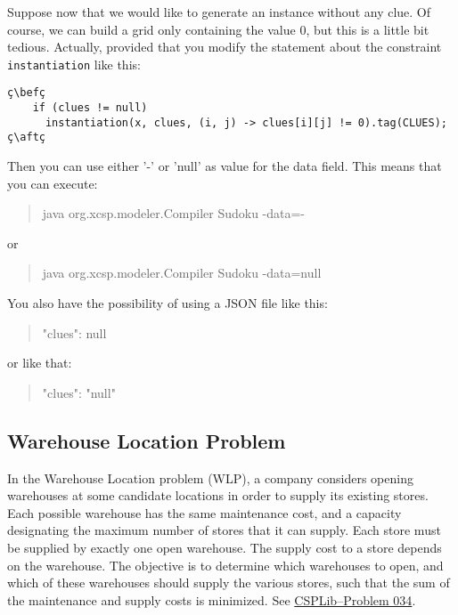 \documentclass[10pt]{article}
\newcommand{\gb}[1]{{\tt #1}} %
\newenvironment{myvb}{\endgraf\small\verbatim}{\endverbatim}
\def\bef{\rule{10cm}{0.1mm}} %
\def\aft{\rule{10cm}{0.1mm}\medskip}
\begin{document}
Suppose now that we would like to generate an instance without any clue.
Of course, we can build a grid only containing the value 0, but this is a little bit tedious. 
Actually, provided that you modify the statement about the constraint \gb{instantiation} like this:

\begin{lstlisting}
ç\befç
    if (clues != null) 
      instantiation(x, clues, (i, j) -> clues[i][j] != 0).tag(CLUES);
ç\aftç
\end{lstlisting}

Then you can use either '-' or 'null' as value for the data field.
This means that you can execute:

\begin{quote}
\begin{myvb}
java org.xcsp.modeler.Compiler Sudoku -data=-
\end{myvb}
\end{quote}
or
\begin{quote}
\begin{myvb}
java org.xcsp.modeler.Compiler Sudoku -data=null
\end{myvb}
\end{quote}

You also have the possibility of using a JSON file like this:

\begin{quote}
\begin{myvb}
{
  "clues": null
}
\end{myvb}
\end{quote}
or like that:
\begin{quote}
\begin{myvb}
{
  "clues": "null"
}
\end{myvb}
\end{quote}



\subsection{Warehouse Location Problem}

In the Warehouse Location problem (WLP), a company considers opening warehouses at some candidate locations in order to supply its existing stores.
Each possible warehouse has the same maintenance cost, and a capacity designating the maximum number of stores that it can supply.
Each store must be supplied by exactly one open warehouse.
The supply cost to a store depends on the warehouse.
The objective is to determine which warehouses to open, and which of these warehouses should supply the various stores, such that the sum of the maintenance and supply costs is minimized.
See \href{http://csplib.org/Problems/prob034/}{CSPLib--Problem 034}.
\end{document}
